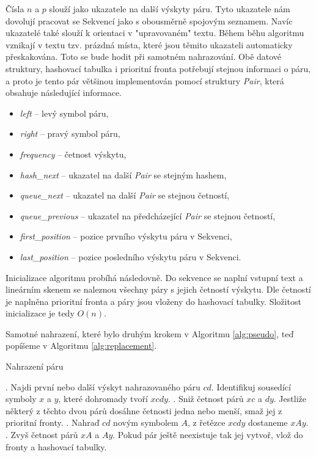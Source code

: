\documentclass[a4paper,12pt]{article}
\begin{document}
Čísla $n$ a $p$ slouží jako ukazatele na další výskyty páru. Tyto ukazatele nám dovolují pracovat se Sekvencí jako s obousměrně spojovým seznamem. Navíc ukazatelé také slouží k orientaci v "upravovaném" textu. Během běhu algoritmu vznikají v textu tzv. prázdná místa, které jsou těmito ukazateli automaticky přeskakována. Toto se bude hodit při samotném nahrazování. Obě datové struktury, hashovací tabulka i prioritní fronta potřebují stejnou informaci o páru, a proto je tento pár většinou implementován pomocí struktury \emph{Pair}, která obsahuje následující informace.
\begin{itemize}
    \item \emph{left} -- levý symbol páru,
    \item \emph{right} -- pravý symbol páru,
    \item \emph{frequency} -- četnost výskytu,
    \item \emph{hash\_next} -- ukazatel na další \emph{Pair} se stejným hashem,
    \item \emph{queue\_next} -- ukazatel na další \emph{Pair} se stejnou četností,
    \item \emph{queue\_previous} -- ukazatel na předcházející \emph{Pair} se stejnou četností,
    \item \emph{first\_position} -- pozice prvního výskytu páru v Sekvenci,
    \item \emph{last\_position} -- pozice posledního výskytu páru v Sekvenci.
\end{itemize}

Inicializace algoritmu probíhá následovně. Do sekvence se naplní vstupní text a lineárním skenem se naleznou všechny páry s jejich četností výskytu. Dle četností je naplněna prioritní fronta a páry jsou vloženy do hashovací tabulky. Složitost inicializace je tedy $O(n)$.

Samotné nahrazení, které bylo druhým krokem v Algoritmu \ref{alg:pseudo}, teď popíšeme v Algoritmu \ref{alg:replacement}.

\begin{algorithm}
    \caption{Nahrazení páru}
    \begin{algorithmic}
        . Najdi první nebo další výskyt nahrazovaného páru $cd$. Identifikuj sousedící symboly $x$ a $y$, které dohromady tvoří $xcdy$.
        . Sniž četnost párů $xc$ a $dy$. Jestliže některý z těchto dvou párů dosáhne četnosti jedna nebo menší, smaž jej z prioritní fronty.
        . Nahraď $cd$ novým symbolem $A$, z řetězce $xcdy$ dostaneme $xAy$.
        . Zvyš četnost párů $xA$ a $Ay$. Pokud pár ještě neexistuje tak jej vytvoř, vlož do fronty a hashovací tabulky.
    \end{algorithmic}
    \label{alg:replacement}
\end{algorithm}
\end{document}
